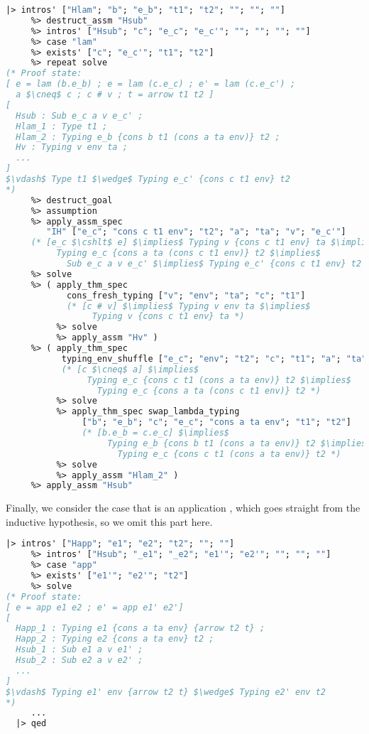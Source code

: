 \documentclass[english, mgr]{iithesis}
\newcommand{\lstt}[1]{\text{{\lstinline[columns=fixed,mathescape]|#1|}}}
\begin{document}
\begin{lstlisting}[mathescape,language=OCaml,escapebegin=\color{codegreen}]
  |> intros' ["Hlam"; "b"; "e_b"; "t1"; "t2"; ""; ""; ""]
     %> destruct_assm "Hsub"
     %> intros' ["Hsub"; "c"; "e_c"; "e_c'"; ""; ""; ""; ""]
     %> case "lam"
     %> exists' ["c"; "e_c'"; "t1"; "t2"]
     %> repeat solve
(* Proof state:
[ e = lam (b.e_b) ; e = lam (c.e_c) ; e' = lam (c.e_c') ;
  a $\cneq$ c ; c # v ; t = arrow t1 t2 ]
[
  Hsub : Sub e_c a v e_c' ;
  Hlam_1 : Type t1 ;
  Hlam_2 : Typing e_b {cons b t1 (cons a ta env)} t2 ;
  Hv : Typing v env ta ;
  ...
]
$\vdash$ Type t1 $\wedge$ Typing e_c' {cons c t1 env} t2
*)
     %> destruct_goal
     %> assumption
     %> apply_assm_spec
        "IH" ["e_c"; "cons c t1 env"; "t2"; "a"; "ta"; "v"; "e_c'"]
     (* [e_c $\cshlt$ e] $\implies$ Typing v {cons c t1 env} ta $\implies$
          Typing e_c {cons a ta (cons c t1 env)} t2 $\implies$
            Sub e_c a v e_c' $\implies$ Typing e_c' {cons c t1 env} t2  *)
     %> solve
     %> ( apply_thm_spec
            cons_fresh_typing ["v"; "env"; "ta"; "c"; "t1"]
            (* [c # v] $\implies$ Typing v env ta $\implies$
                 Typing v {cons c t1 env} ta *)
          %> solve
          %> apply_assm "Hv" )
     %> ( apply_thm_spec
           typing_env_shuffle ["e_c"; "env"; "t2"; "c"; "t1"; "a"; "ta"]
           (* [c $\cneq$ a] $\implies$
                Typing e_c {cons c t1 (cons a ta env)} t2 $\implies$
                  Typing e_c {cons a ta (cons c t1 env)} t2 *)
          %> solve
          %> apply_thm_spec swap_lambda_typing
               ["b"; "e_b"; "c"; "e_c"; "cons a ta env"; "t1"; "t2"]
               (* [b.e_b = c.e_c] $\implies$
                    Typing e_b {cons b t1 (cons a ta env)} t2 $\implies$
                      Typing e_c {cons c t1 (cons a ta env)} t2 *)
          %> solve
          %> apply_assm "Hlam_2" )
     %> apply_assm "Hsub"
\end{lstlisting}
Finally, we consider the case that \lstt{e} is an application \lstt{e1 e2},
which goes straight from the inductive hypothesis, so we omit this part here.
\begin{lstlisting}[mathescape,language=OCaml,escapebegin=\color{codegreen}]
  |> intros' ["Happ"; "e1"; "e2"; "t2"; ""; ""]
     %> intros' ["Hsub"; "_e1"; "_e2"; "e1'"; "e2'"; ""; ""; ""]
     %> case "app"
     %> exists' ["e1'"; "e2'"; "t2"]
     %> solve
(* Proof state:
[ e = app e1 e2 ; e' = app e1' e2']
[
  Happ_1 : Typing e1 {cons a ta env} {arrow t2 t} ;
  Happ_2 : Typing e2 {cons a ta env} t2 ;
  Hsub_1 : Sub e1 a v e1' ;
  Hsub_2 : Sub e2 a v e2' ;
  ...
]
$\vdash$ Typing e1' env {arrow t2 t} $\wedge$ Typing e2' env t2
*)
     ...
  |> qed
\end{lstlisting}
\end{document}
